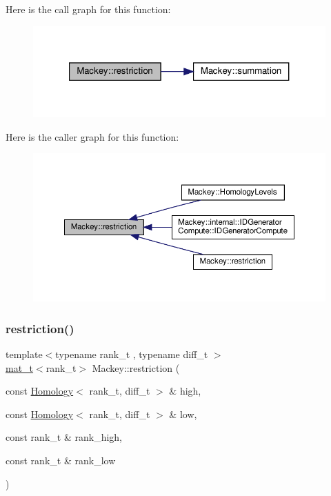 Here is the call graph for this function\+:\nopagebreak
\begin{figure}[H]
\begin{center}
\leavevmode
\includegraphics[width=321pt]{namespaceMackey_ad1e907ff76b07d4fc4c9d4bdf25918bd_cgraph}
\end{center}
\end{figure}
Here is the caller graph for this function\+:\nopagebreak
\begin{figure}[H]
\begin{center}
\leavevmode
\includegraphics[width=350pt]{namespaceMackey_ad1e907ff76b07d4fc4c9d4bdf25918bd_icgraph}
\end{center}
\end{figure}
\mbox{\label{namespaceMackey_a6818760aa9590810daace862e4c71f04}} 
\subsubsection{\texorpdfstring{restriction()}{restriction()}\hspace{0.1cm}{\footnotesize\ttfamily [2/2]}}
{\footnotesize\ttfamily template$<$typename rank\+\_\+t , typename diff\+\_\+t $>$ \\
\hyperlink{namespaceMackey_a035386035757dade630f685e508e5cf9}{mat\+\_\+t}$<$rank\+\_\+t$>$ Mackey\+::restriction (\begin{DoxyParamCaption}\item[{const \hyperlink{classMackey_1_1Homology}{Homology}$<$ rank\+\_\+t, diff\+\_\+t $>$ \&}]{high,  }\item[{const \hyperlink{classMackey_1_1Homology}{Homology}$<$ rank\+\_\+t, diff\+\_\+t $>$ \&}]{low,  }\item[{const rank\+\_\+t \&}]{rank\+\_\+high,  }\item[{const rank\+\_\+t \&}]{rank\+\_\+low }\end{DoxyParamCaption})}



